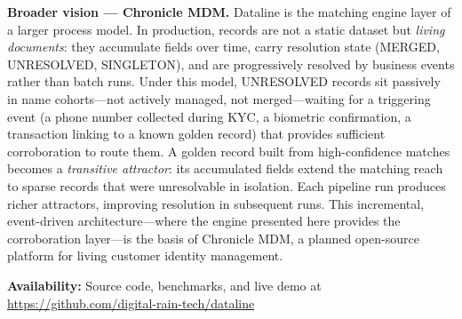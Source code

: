 \documentclass{article}
\begin{document}
\medskip
\noindent\textbf{Broader vision — Chronicle MDM.} Dataline is the matching engine layer of a larger process model. In production, records are not a static dataset but \emph{living documents}: they accumulate fields over time, carry resolution state (MERGED, UNRESOLVED, SINGLETON), and are progressively resolved by business events rather than batch runs. Under this model, UNRESOLVED records sit passively in name cohorts—not actively managed, not merged—waiting for a triggering event (a phone number collected during KYC, a biometric confirmation, a transaction linking to a known golden record) that provides sufficient corroboration to route them. A golden record built from high-confidence matches becomes a \emph{transitive attractor}: its accumulated fields extend the matching reach to sparse records that were unresolvable in isolation. Each pipeline run produces richer attractors, improving resolution in subsequent runs. This incremental, event-driven architecture—where the engine presented here provides the corroboration layer—is the basis of Chronicle MDM, a planned open-source platform for living customer identity management.

\medskip
\noindent\textbf{Availability:} Source code, benchmarks, and live demo at \url{https://github.com/digital-rain-tech/dataline}



\end{document}
